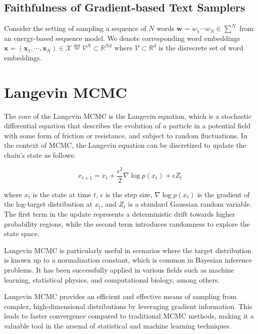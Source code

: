 \documentclass{article}
\newcommand*{\defeq}{\stackrel{\text{def}}{=}}
\begin{document}
\subsection{Faithfulness of Gradient-based Text Samplers}
Consider the setting of sampling a sequence of $N$ words $\boldsymbol{w} = w_1 \cdots w_N \in \sum^{N}$ from an energy-based sequence model. We denote corresponding word embeddings $\boldsymbol{x} = (\boldsymbol{x}_1, \cdots, \boldsymbol{x}_N) \in \mathcal{X} \defeq \mathcal{V}^N \subset \mathbb{R}^{Nd}$ where $\mathcal{V} \subset \mathbb{R}^d$ is the disrecrete set of word embeddings.

\section{Langevin MCMC}

The core of the Langevin MCMC is the Langevin equation, which is a stochastic differential equation that describes the evolution of a particle in a potential field with some form of friction or resistance, and subject to random fluctuations. In the context of MCMC, the Langevin equation can be discretized to update the chain's state as follows:

\begin{equation}
x_{t+1} = x_t + \frac{\epsilon^2}{2} \nabla \log p(x_t) + \epsilon Z_t
\end{equation}

where $x_t$ is the state at time $t$, $\epsilon$ is the step size, $\nabla \log p(x_t)$ is the gradient of the log-target distribution at $x_t$, and $Z_t$ is a standard Gaussian random variable. The first term in the update represents a deterministic drift towards higher probability regions, while the second term introduces randomness to explore the state space.

Langevin MCMC is particularly useful in scenarios where the target distribution is known up to a normalization constant, which is common in Bayesian inference problems. It has been successfully applied in various fields such as machine learning, statistical physics, and computational biology, among others.

Langevin MCMC provides an efficient and effective means of sampling from complex, high-dimensional distributions by leveraging gradient information. This leads to faster convergence compared to traditional MCMC methods, making it a valuable tool in the arsenal of statistical and machine learning techniques.
\end{document}
